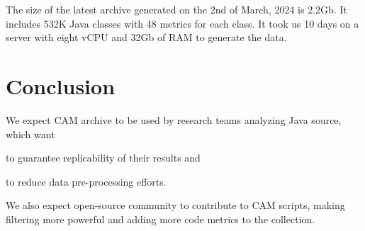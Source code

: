 \documentclass[11pt,sigplan,nonacm]{acmart}
\begin{document}
The size of the latest archive generated on the 2nd of March, 2024 is 2.2Gb. It includes 532K Java classes with 48 metrics for each class. It took us 10 days on a server with eight vCPU and 32Gb of RAM to generate the data.

\section*{Conclusion}

We expect CAM archive to be used by research teams analyzing Java source, which want
\begin{inparaenum}[(a)]
\item to guarantee replicability of their results
and
\item to reduce data pre-processing efforts.
\end{inparaenum}
We also expect open-source community to contribute to CAM scripts, making filtering more powerful and adding more code metrics to the collection.



\end{document}
